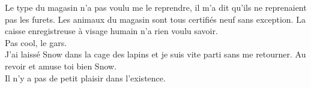 Le type du magasin n'a pas voulu me le reprendre, il m'a dit qu'ils ne reprenaient pas les furets. Les animaux du magasin sont tous certifiés neuf sans exception. La caisse enregistreuse à visage humain n'a rien voulu savoir. \\

Pas cool, le gars. \\

J'ai laissé Snow dans la cage des lapins et je suis vite parti sans me retourner. Au revoir et amuse toi bien Snow. \\

Il n'y a pas de petit plaisir dans l'existence.
